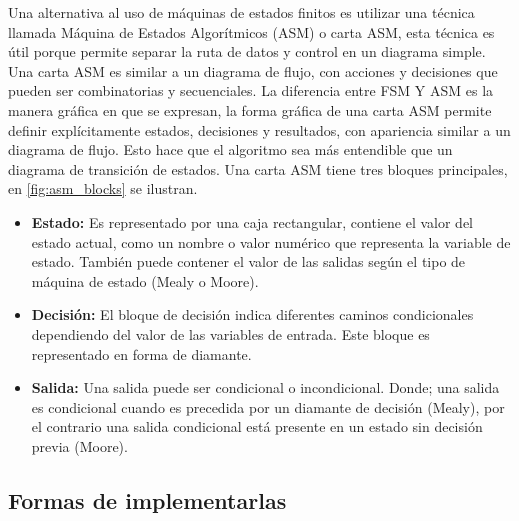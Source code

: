 Una alternativa al uso de máquinas de estados finitos es utilizar una técnica llamada Máquina de Estados Algorítmicos (ASM) o carta ASM, esta técnica es útil porque permite separar la ruta de datos y control en un diagrama simple. Una carta ASM es similar a un diagrama de flujo, con acciones y decisiones que pueden ser combinatorias y secuenciales. La diferencia entre FSM Y ASM es la manera gráfica en que se expresan, la forma gráfica de una carta ASM permite definir explícitamente estados, decisiones y resultados, con apariencia similar a un diagrama de flujo. Esto hace que el algoritmo sea más entendible que un diagrama de transición de estados. Una carta ASM tiene tres bloques principales, en \ref{fig:asm_blocks} se ilustran.

\begin{itemize}
    \item \textbf{Estado:} Es representado por una caja rectangular, contiene el valor del estado actual, como un nombre o valor numérico que representa la variable de estado. También puede contener el valor de las salidas según el tipo de máquina de estado (Mealy o Moore).
    \item \textbf{Decisión:}  El bloque de decisión indica diferentes caminos condicionales dependiendo del valor de las variables de entrada. Este bloque es representado en forma de diamante.
    \item \textbf{Salida:} Una salida puede ser condicional o incondicional. Donde; una salida es condicional cuando es precedida por un diamante de decisión (Mealy), por el contrario una salida condicional está presente en un estado sin decisión previa (Moore).
\end{itemize}

\subsection{Formas de implementarlas} \label{sub:formas_de_implementarlas}

